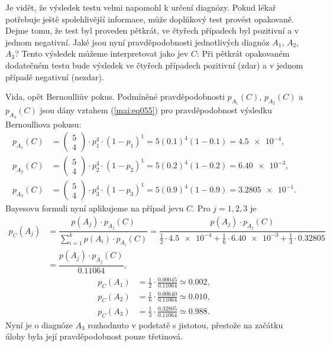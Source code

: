 \begin{example}
  Je vidět, že výsledek testu velmi napomohl k určení diagnózy. Pokud lékař potřebuje ještě 
  spolehlivější informace, může doplňkový test provést opakovaně. Dejme tomu, že test byl proveden 
  pětkrát, ve čtyřech případech byl pozitivní a v jednom negativní. Jaké jsou nyní pravděpodobnosti 
  jednotlivých diagnóz \(A_1\), \(A_2\), \(A_3\)? Tento výsledek můžeme interpretovat jako jev 
  \(C\): Při pětkrát opakovaném dodatečném testu bude výsledek ve čtyřech případech pozitivní (zdar)
  a v jednom případě negativní (nezdar).
  
  Vida, opět Bernoulliův pokus. Podmíněné pravděpodobnosti \(p_{A_1}(C)\), \(p_{A_2}(C)\) a 
  \(p_{A_3}(C)\) jsou dány vztahem (\ref{mai:eq055}) pro pravděpodobnost výsledku Bernoulliova 
  pokusu:
  \begin{align*}
    p_{A_1}(C) &= \begin{pmatrix} 5 \\ 4 \end{pmatrix}\cdot p_1^4\cdot(1-p_1)^1 
                = 5(\num{0.1})^4(1 - \num{0.1}) = \num{4.5e-4},                   \\
    p_{A_2}(C) &= \begin{pmatrix} 5 \\ 4 \end{pmatrix}\cdot p_2^4\cdot(1-p_2)^1
                = 5(\num{0.2})^4(1 - \num{0.2}) = \num{6.40e-3},                  \\
    p_{A_3}(C) &= \begin{pmatrix} 5 \\ 4 \end{pmatrix}\cdot p_3^4\cdot(1-p_3)^1
                = 5(\num{0.9})^4(1 - \num{0.9}) = \num{3.2805e-1}. 
  \end{align*}
  Bayesovu formuli nyní aplikujeme na případ jevu \(C\). Pro \(j = 1, 2, 3\) je
  \begin{align*}
    p_C(A_j) &= \dfrac{p(A_j)\cdot p_{A_j}(C)}{\sum_{i=1}^{k}p(A_i)\cdot p_{A_i}(C)}  
              = \dfrac{p(A_j)\cdot p_{A_j}(C)}{\frac{1}{2}\cdot\num{4.5e-4} + 
                                               \frac{1}{6}\cdot\num{6.40e-3} + 
                                               \frac{1}{3}\cdot\num{0.32805}}   \\
             &= \dfrac{p(A_j)\cdot p_{A_j}(C)}{\num{0.11064}},
  \end{align*}
  \begin{align*}
    p_C(A_1) &= \frac{1}{2} \cdot\frac{\num{0.00045}}{\num{0.11064}}\simeq\num{0.002},     \\
    p_C(A_2) &= \frac{1}{6} \cdot\frac{\num{0.00640}}{\num{0.11064}}\simeq\num{0.010},     \\
    p_C(A_3) &= \frac{1}{3} \cdot\frac{\num{0.32805}}{\num{0.11064}}\simeq\num{0.988}.
  \end{align*}
  Nyní je o diagnóze \(A_3\) rozhodnuto v podstatě s jistotou, přestože na začátku úlohy byla její 
  pravděpodobnost pouze třetinová.
\normalsize
\end{example}
